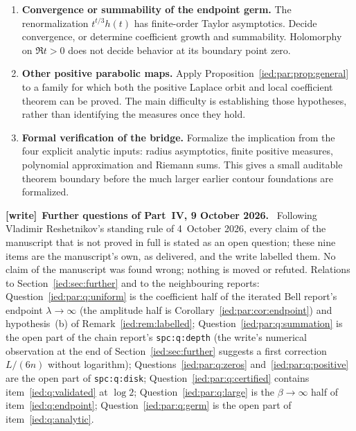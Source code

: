 \documentclass[11pt,letterpaper]{article}
\theoremstyle{remark}\newtheorem{remark}[theorem]{Remark}
\newcommand{\file}[1]{\nolinkurl{#1}}
\newenvironment{writenote}[1][]{\par\smallskip\begingroup\small
 \noindent\textbf{[write]}\if\relax\detokenize{#1}\relax\else~\textbf{#1.}\fi\ }%
 {\par\endgroup\smallskip}
\begin{document}
\begin{enumerate}[leftmargin=*,itemsep=5pt]
\item\label{ied:par:q:germ} \textbf{Convergence or summability of the endpoint germ.}
The renormalization $t^{t/3}h(t)$ has finite-order Taylor asymptotics.
Decide convergence, or determine coefficient growth and summability.
Holomorphy on $\Re t>0$ does not decide behavior at its boundary
point zero.

\item\label{ied:par:q:other} \textbf{Other positive parabolic maps.}
Apply Proposition~\ref{ied:par:prop:general} to a family for which both the
positive Laplace orbit and local coefficient theorem can be proved.
The main difficulty is establishing those hypotheses, rather than
identifying the measures once they hold.

\item\label{ied:par:q:formal} \textbf{Formal verification of the bridge.}
Formalize the implication from the four explicit analytic inputs:
radius asymptotics, finite positive measures, polynomial approximation
and Riemann sums. This gives a small auditable theorem boundary before
the much larger earlier contour foundations are formalized.
\end{enumerate}
\begin{writenote}[Further questions of Part~IV, 9 October 2026]
Following Vladimir Reshetnikov's standing rule of 4~October 2026, every claim
of the manuscript that is not proved in full is stated as an open question;
these nine items are the manuscript's own, as delivered, and the write labelled
them. No claim of the manuscript was found wrong; nothing is moved or refuted.
Relations to Section~\ref{ied:sec:further} and to the neighbouring reports:
Question~\ref{ied:par:q:uniform} is the coefficient half of the iterated Bell
report's endpoint $\lambda\to\infty$ (the amplitude half is
Corollary~\ref{ied:par:cor:endpoint}) and hypothesis~(b) of
Remark~\ref{ied:rem:labelled}; Question~\ref{ied:par:q:summation} is the
open part of the chain report's \file{spc:q:depth} (the write's numerical
observation at the end of Section~\ref{ied:sec:further} suggests a first
correction $L/(6n)$ without logarithm); Questions~\ref{ied:par:q:zeros}
and~\ref{ied:par:q:positive} are the open part of \file{spc:q:disk};
Question~\ref{ied:par:q:certified} contains item~\ref{ied:q:validated} at
$\log2$; Question~\ref{ied:par:q:large} is the $\beta\to\infty$ half of
item~\ref{ied:q:endpoint}; Question~\ref{ied:par:q:germ} is the open part of
item~\ref{ied:q:analytic}.
\end{writenote}
\end{document}
